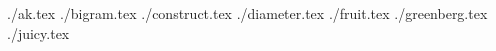 \documentclass[11pt,letterpaper,oneside]{article}
\newcommand{\importproblem}[2]{{./#2.tex}}
\begin{document}
\raggedbottom

\importproblem{a}{ak}
\importproblem{b}{bigram}
\importproblem{c}{construct}
\importproblem{d}{diameter}
\importproblem{f}{fruit}
\importproblem{g}{greenberg}
\importproblem{j}{juicy}
\end{document}
